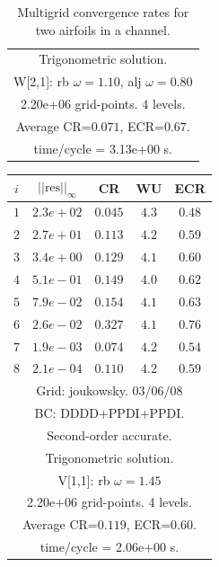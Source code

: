 \begin{table}[hbt]
\begin{center}
{\begin{tabular}{|c|c|c|c|c|}
\multicolumn{5}{|c|}{Trigonometric solution.}  \\
\multicolumn{5}{|c|}{W[2,1]: rb $\omega=1.10$, alj $\omega=0.80$}  \\
\multicolumn{5}{|c|}{2.20e+06 grid-points. 4 levels.}  \\
\multicolumn{5}{|c|}{Average CR=$0.071$, ECR=$0.67$.}  \\
\multicolumn{5}{|c|}{time/cycle = 3.13e+00 s.}  \\
\hline 
\end{tabular}
} %
\end{center}
\caption{Multigrid convergence rates for two airfoils in a channel.}
\label{fig:smoothBox}
\end{table}


\begin{table}[hbt]
\begin{center}
{\tablefontsize
\begin{tabular}{|c|c|c|c|c|} \hline 
 $i$   & $\vert\vert\mbox{res}\vert\vert_\infty$  &  CR     &  WU    & ECR  \\   \hline 
 $ 1$  & $ 2.3e+02$ & $0.045$ & $ 4.3$ & $0.48$ \\ 
 $ 2$  & $ 2.7e+01$ & $0.113$ & $ 4.2$ & $0.59$ \\ 
 $ 3$  & $ 3.4e+00$ & $0.129$ & $ 4.1$ & $0.60$ \\ 
 $ 4$  & $ 5.1e-01$ & $0.149$ & $ 4.0$ & $0.62$ \\ 
 $ 5$  & $ 7.9e-02$ & $0.154$ & $ 4.1$ & $0.63$ \\ 
 $ 6$  & $ 2.6e-02$ & $0.327$ & $ 4.1$ & $0.76$ \\ 
 $ 7$  & $ 1.9e-03$ & $0.074$ & $ 4.2$ & $0.54$ \\ 
 $ 8$  & $ 2.1e-04$ & $0.110$ & $ 4.2$ & $0.59$ \\ 
\hline 
\multicolumn{5}{|c|}{Grid: joukowsky. 03/06/08}  \\
\multicolumn{5}{|c|}{BC: DDDD+PPDI+PPDI.}  \\
\multicolumn{5}{|c|}{Second-order accurate.}  \\
\multicolumn{5}{|c|}{Trigonometric solution.}  \\
\multicolumn{5}{|c|}{V[1,1]: rb $\omega=1.45$}  \\
\multicolumn{5}{|c|}{2.20e+06 grid-points. 4 levels.}  \\
\multicolumn{5}{|c|}{Average CR=$0.119$, ECR=$0.60$.}  \\
\multicolumn{5}{|c|}{time/cycle = 2.06e+00 s.}  \\

\end{tabular}}
\end{center}
\end{table}
